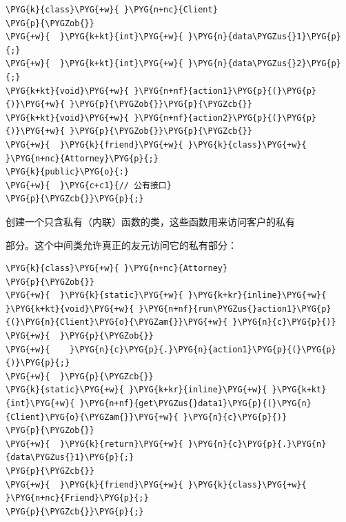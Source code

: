 \begin{codeblockbg}
\begin{Verbatim}[commandchars=\\\{\},breaklines=true,breakanywhere=true,fontsize=\codefont,xleftmargin=17bp]
\PYG{k}{class}\PYG{+w}{ }\PYG{n+nc}{Client}
\PYG{p}{\PYGZob{}}
\PYG{+w}{  }\PYG{k+kt}{int}\PYG{+w}{ }\PYG{n}{data\PYGZus{}1}\PYG{p}{;}
\PYG{+w}{  }\PYG{k+kt}{int}\PYG{+w}{ }\PYG{n}{data\PYGZus{}2}\PYG{p}{;}
\PYG{k+kt}{void}\PYG{+w}{ }\PYG{n+nf}{action1}\PYG{p}{(}\PYG{p}{)}\PYG{+w}{ }\PYG{p}{\PYGZob{}}\PYG{p}{\PYGZcb{}}
\PYG{k+kt}{void}\PYG{+w}{ }\PYG{n+nf}{action2}\PYG{p}{(}\PYG{p}{)}\PYG{+w}{ }\PYG{p}{\PYGZob{}}\PYG{p}{\PYGZcb{}}
\PYG{+w}{  }\PYG{k}{friend}\PYG{+w}{ }\PYG{k}{class}\PYG{+w}{ }\PYG{n+nc}{Attorney}\PYG{p}{;}
\PYG{k}{public}\PYG{o}{:}
\PYG{+w}{  }\PYG{c+c1}{// 公有接口}
\PYG{p}{\PYGZcb{}}\PYG{p}{;}
\end{Verbatim}
\end{codeblockbg}



创建一个只含私有（内联）函数的类，这些函数用来访问客户的私有



部分。这个中间类允许真正的友元访问它的私有部分：



\begin{codeblockbg}
\begin{Verbatim}[commandchars=\\\{\},breaklines=true,breakanywhere=true,fontsize=\codefont,xleftmargin=17bp]
\PYG{k}{class}\PYG{+w}{ }\PYG{n+nc}{Attorney}
\PYG{p}{\PYGZob{}}
\PYG{+w}{  }\PYG{k}{static}\PYG{+w}{ }\PYG{k+kr}{inline}\PYG{+w}{ }\PYG{k+kt}{void}\PYG{+w}{ }\PYG{n+nf}{run\PYGZus{}action1}\PYG{p}{(}\PYG{n}{Client}\PYG{o}{\PYGZam{}}\PYG{+w}{ }\PYG{n}{c}\PYG{p}{)}
\PYG{+w}{  }\PYG{p}{\PYGZob{}}
\PYG{+w}{    }\PYG{n}{c}\PYG{p}{.}\PYG{n}{action1}\PYG{p}{(}\PYG{p}{)}\PYG{p}{;}
\PYG{+w}{  }\PYG{p}{\PYGZcb{}}
\PYG{k}{static}\PYG{+w}{ }\PYG{k+kr}{inline}\PYG{+w}{ }\PYG{k+kt}{int}\PYG{+w}{ }\PYG{n+nf}{get\PYGZus{}data1}\PYG{p}{(}\PYG{n}{Client}\PYG{o}{\PYGZam{}}\PYG{+w}{ }\PYG{n}{c}\PYG{p}{)}
\PYG{p}{\PYGZob{}}
\PYG{+w}{  }\PYG{k}{return}\PYG{+w}{ }\PYG{n}{c}\PYG{p}{.}\PYG{n}{data\PYGZus{}1}\PYG{p}{;}
\PYG{p}{\PYGZcb{}}
\PYG{+w}{  }\PYG{k}{friend}\PYG{+w}{ }\PYG{k}{class}\PYG{+w}{ }\PYG{n+nc}{Friend}\PYG{p}{;}
\PYG{p}{\PYGZcb{}}\PYG{p}{;}
\end{Verbatim}
\end{codeblockbg}



